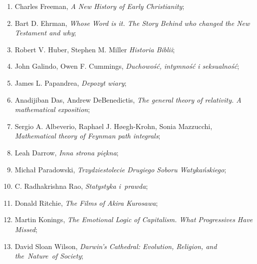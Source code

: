 \documentclass[a4paper,11pt]{article}
\begin{document}
\begin{enumerate}
\item Charles Freeman, \textit{A New History of Early Christianity};



\item Bart D. Ehrman, \textit{Whose Word is it. The Story Behind who
    changed the New Testament and why};



\item Robert V. Huber, Stephen M. Miller \textit{Historia Biblii};



\item John Galindo, Owen F. Cummings, \textit{Duchowość, intymność i
    seksualność};



\item James L. Papandrea, \textit{Depozyt wiary};



\item Anadijiban Das, Andrew DeBenedictis, \textit{The general theory of
    relativity. A mathematical exposition};



\item Sergio A. Albeverio, Raphael J. H\o egh-Krohn, Sonia Mazzucchi,
  \textit{Mathematical theory of Feynman path integrals};



\item Leah Darrow, \textit{Inna strona piękna};



\item Michał Paradowski, \textit{Trzydziestolecie Drugiego Soboru
    Watykańskiego};



\item C. Radhakrishna Rao, \textit{Statystyka i~prawda};



\item Donald Ritchie, \textit{The Films of Akira Kurosawa};



\item Martin Konings, \textit{The Emotional Logic of Capitalism. What
    Progressives Have Missed};



\item David Sloan Wilson, \textit{Darwin's Cathedral: Evolution,
    Religion, and the~Nature~of Society};




\end{enumerate}
\end{document}
